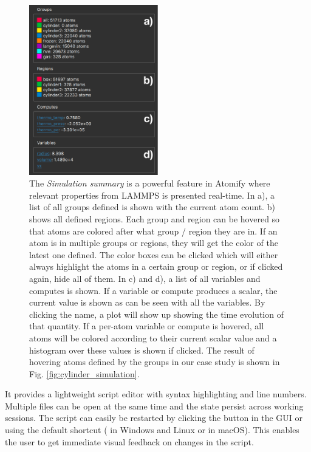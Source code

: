 \documentclass[aps,pre,twocolumn,letterpaper,floatfix,nofootinbib]{revtex4}
\begin{document}
\begin{figure}
	\centering
	\includegraphics[width=0.5\textwidth]{figures/rightbar.pdf}
	\caption{
		The \textit{Simulation summary} is a powerful feature in Atomify where relevant
		properties from LAMMPS is presented real-time.
		In a), a list of all groups defined is shown with the current atom count.
		b) shows all defined regions. Each group and region can be hovered so that atoms
		are colored after what group / region they are in. If an atom is in multiple
		groups or regions, they will get the color of the latest one defined.
		The color boxes can be clicked which will either always highlight the atoms in a certain group or region,
		or if clicked again, hide all of them.
		In c) and d), a list of all variables and computes is shown. If a variable or compute
		produces a scalar, the current value is shown as can be seen with all the variables.
		By clicking the name, a plot will show up showing the time evolution of that quantity.
		If a per-atom variable or compute is hovered, all atoms will be colored according to their
		current scalar value and a histogram over these values is shown if clicked.
		The result of hovering atoms defined by the groups in our case study is shown in Fig. \ref{fig:cylinder_simulation}.
    }
	\label{fig:rightbar}
\end{figure}

It provides a lightweight script editor with syntax highlighting and line numbers.
Multiple files can be open at the same time and the state persist across working sessions.
The script can easily be restarted by clicking the button in the GUI or using
the default shortcut ( in Windows and Linux or  in macOS).
This enables the user to get immediate visual feedback on changes in the script.
\end{document}
